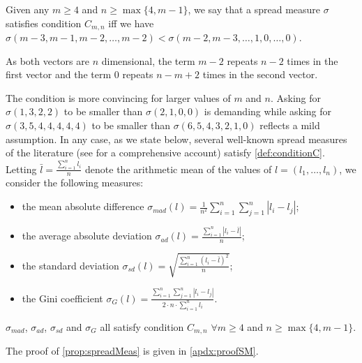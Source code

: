 \documentclass[version=3.21, pagesize, twoside=off, bibliography=totoc, DIV=calc, fontsize=12pt, a4paper]{scrartcl}
\begin{document}
\begin{definition}
	\label{def:conditionC}
	Given any $m\geq4$ and $n\geq \max\{4,m-1\}$, we say that a spread measure $\sigma$ satisfies condition $C_{m,n}$ iff we have $\sigma(m-3, m-1, m-2, \dots, m-2) < \sigma(m-2, m-3, \dots, 1, 0, \dots, 0)$.
\end{definition}

As both vectors are $n$ dimensional, the term $m-2$ repeats $n-2$ times in the first vector and the term $0$ repeats $n-m+2$ times in the second vector.

The condition is more convincing for larger values of $m$ and $n$. Asking for $\sigma(1,3,2,2)$ to be smaller than $\sigma(2,1,0,0)$ is demanding while asking for $\sigma(3,5,4,4,4,4,4)$ to be smaller than $\sigma(6,5,4,3,2,1,0)$ reflects a mild assumption. In any case, as we state below, several well-known spread measures of the literature (see \citet{Allison1978} for a comprehensive account) satisfy \cref{def:conditionC}. Letting $\bar{l}=\frac{\sum_{i=1}^{n}l_i}{n}$ denote the arithmetic mean of the values of $l = (l_1, …, l_n)$, we consider the following measures:

\begin{itemize}
	\item the mean absolute difference $\sigma_{mad}(l)= \frac{1}{n^2} \sum_{i=1}^{n}\sum_{j=1}^{n}|l_i-l_j|$;
	\item the average absolute deviation $\sigma_{ad}(l)= \frac{\sum_{i=1}^{n}|l_i-\bar{l}|}{n}$;
	\item the standard deviation $\sigma_{sd}(l)= \sqrt{\frac{\sum_{i=1}^{n}(l_i-\bar{l})^2}{n}}$;
	\item the Gini coefficient $\sigma_{G}(l)= \frac{\sum_{i=1}^{n}\sum_{j=1}^{n}|l_i-l_j|}{2 \cdot n \cdot \sum_{i=1}^{n} l_i}$.
\end{itemize} 

\begin{proposition}
\label{prop:spreadMeas}
	$\sigma_{mad}$, $\sigma_{ad}$, $\sigma_{sd}$ and $\sigma_{G}$ all satisfy condition $C_{m,n}$ $\forall m\geq4$ and $n\geq\max\{4,m-1\}$. 
\end{proposition}

The proof of \cref{prop:spreadMeas} is given in \cref{apdx:proofSM}.

\end{document}
